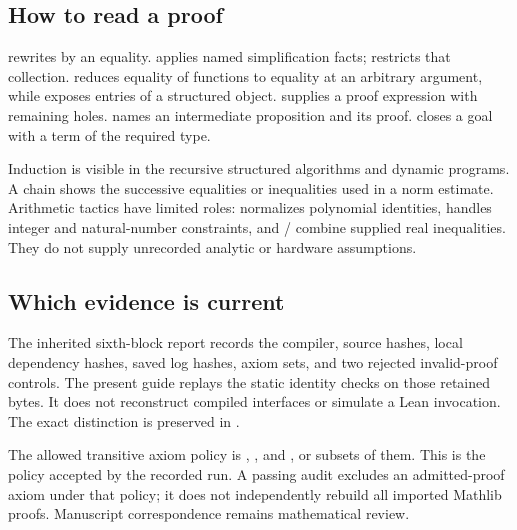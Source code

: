 \subsection{How to read a proof}
 rewrites by an equality.  applies named simplification facts;  restricts that collection.  reduces equality of functions to equality at an arbitrary argument, while  exposes entries of a structured object.  supplies a proof expression with remaining holes.  names an intermediate proposition and its proof.  closes a goal with a term of the required type.

Induction is visible in the recursive structured algorithms and dynamic programs. A  chain shows the successive equalities or inequalities used in a norm estimate. Arithmetic tactics have limited roles:  normalizes polynomial identities,  handles integer and natural-number constraints, and / combine supplied real inequalities. They do not supply unrecorded analytic or hardware assumptions.

\subsection{Which evidence is current}
The inherited sixth-block report records the compiler, source hashes, local dependency hashes, saved log hashes, axiom sets, and two rejected invalid-proof controls. The present guide replays the static identity checks on those retained bytes. It does not reconstruct compiled interfaces or simulate a Lean invocation. The exact distinction is preserved in .

The allowed transitive axiom policy is , , and , or subsets of them. This is the policy accepted by the recorded run. A passing audit excludes an admitted-proof axiom under that policy; it does not independently rebuild all imported Mathlib proofs. Manuscript correspondence remains mathematical review.
